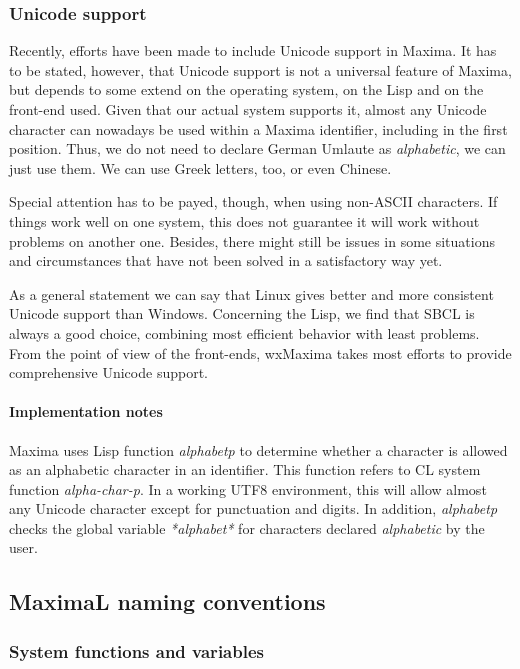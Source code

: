 \documentclass[../Maxima_Workbook.tex]{subfiles}
\begin{document}
\subsubsection{Unicode support}

Recently, efforts have been made to include Unicode support in Maxima. It has to be stated, however, that Unicode support is not a universal feature of Maxima, but depends to some extend on the operating system, on the Lisp and on the front-end used. Given that our actual system supports it, almost any Unicode character can nowadays be used within a Maxima identifier, including in the first position. Thus, we do not need to declare German Umlaute as \emph{alphabetic}, we can just use them. We can use Greek letters, too, or even Chinese.

\lz Special attention has to be payed, though, when using non-ASCII characters. If things work well on one system, this does not guarantee it will work without problems on another one. Besides, there might still be issues in some situations and circumstances that have not been solved in a satisfactory way yet.

\lz As a general statement we can say that Linux gives better and more consistent Unicode support than Windows. Concerning the Lisp, we find that SBCL is always a good choice, combining most efficient behavior with least problems. From the point of view of the front-ends, wxMaxima takes most efforts to provide comprehensive Unicode support.

\paragraph{Implementation notes} \mbox{}

\lz Maxima uses Lisp function \emph{alphabetp} to determine whether a character is allowed as an alphabetic character in an identifier. This function refers to CL system function \emph{alpha-char-p}. In a working UTF8 environment, this will allow almost any Unicode character except for punctuation and digits. In addition, \emph{alphabetp} checks the global variable \emph{*alphabet*} for characters declared \emph{alphabetic} by the user.

\subsection{MaximaL naming conventions}

\subsubsection{System functions and variables}
\end{document}
